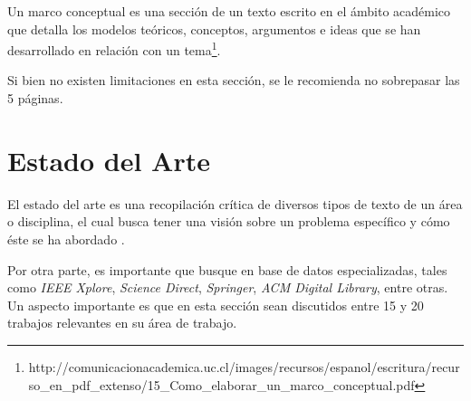 Un marco conceptual es una sección de un texto escrito en el ámbito académico que detalla los modelos teóricos, conceptos, argumentos e ideas que se han desarrollado en relación con un tema\footnote{http://comunicacionacademica.uc.cl/images/recursos/espanol/escritura/recurso\_en\_pdf\_extenso/15\_Como\_elaborar\_un\_marco\_conceptual.pdf}. 

Si bien no existen limitaciones en esta sección, se le recomienda no sobrepasar las 5 páginas. 



\section{Estado del Arte}
\label{sc:EA}

El estado del arte es una recopilación crítica de diversos tipos de texto de un área o disciplina, el cual busca tener una visión sobre un problema específico y cómo éste se ha abordado \cite{londono2014guias}. 

Por otra parte, es importante que busque en base de datos especializadas, tales como \textit{IEEE Xplore}, \textit{Science Direct}, \textit{Springer}, \textit{ACM Digital Library}, entre otras. Un aspecto importante es que en esta sección sean discutidos entre 15 y 20 trabajos relevantes en su área de trabajo. 